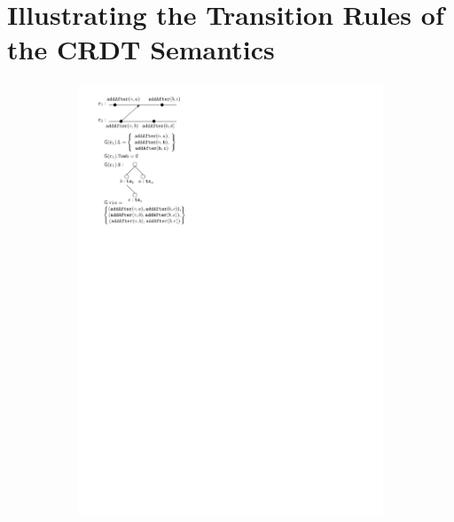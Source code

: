 \section{Illustrating the Transition Rules of the CRDT Semantics}

\begin{figure}[t]
  \begin{subfigure}[!ht]{.3\linewidth}
    \includegraphics[scale=.7]{figures/LinRGA-1}
      \vspace{1.3cm}
    \caption{}
    \label{fig:rga-sem-1}
  \end{subfigure}
  \begin{subfigure}[!ht]{.3\linewidth}

\end{subfigure}
\end{figure}
